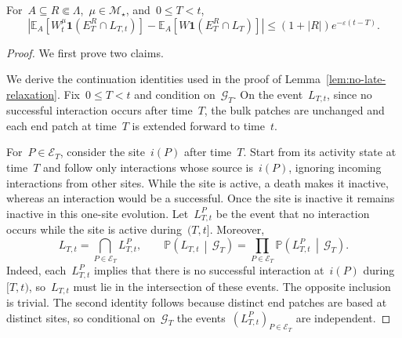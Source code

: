 \documentclass[EJP,preprint,NODS,nobera]{ejpecp}
\newcommand{\pP}{\mathbb{P}}
\newcommand{\E}{\mathbb{E}}
\newcommand{\CP}[2]{\pP\bb{#1\,\middle|\,#2}}
\newcommand{\bb}[1]{\left(#1\right)}
\newcommand{\Cb}[1]{\left[#1\right]}
\newcommand{\abs}[1]{\left|#1\right|}
\newcommand{\ind}{\mathbf{1}}
\begin{document}
\begin{lemma}
\label{lem:no-late-relaxation}
For~$A\subseteq R\Subset\Lambda$,~$\mu\in\mathcal M_\star$, and~$0\leq T<t$,
\begin{equation}
\label{eq:no-late-relaxation-bound}
\abs{
 \E_A\Cb{W_t^\mu\ind\bb{E_T^R\cap L_{T,t}}}
 -
 \E_A\Cb{W\ind\bb{E_T^R\cap L_T}}
}
\leq
\bb{1+\abs R}e^{-\varepsilon\bb{t-T}}.
\end{equation}
\end{lemma}

\begin{proof}
We first prove two claims.

We derive the continuation identities used in the proof of
Lemma~\ref{lem:no-late-relaxation}. Fix~$0\leq T<t$ and condition on~$\mathcal G_T$. On the event~$L_{T,t}$, since no successful interaction occurs after time~$T$, the bulk
patches are unchanged and each end patch at time~$T$ is extended forward to time~$t$.

For~$P\in\mathcal E_T$, consider the site~$i(P)$ after time~$T$.
Start from its activity state at time~$T$ and follow only interactions whose
source is~$i(P)$, ignoring incoming interactions from other sites. While the
site is active, a death makes it inactive, whereas an
interaction would be a successful. Once the site is inactive it
remains inactive in this one-site evolution. Let~$L_{T,t}^P$ be the event that
no interaction occurs while the site is active during~$(T,t]$. 
Moreover,
\begin{equation}
\label{eq:local-no-late-factorization}
L_{T,t}
=
\bigcap_{P\in\mathcal E_T}L_{T,t}^P,
\qquad
\CP{L_{T,t}}{\mathcal G_T}
=
\prod_{P\in\mathcal E_T}
\CP{L_{T,t}^P}{\mathcal G_T}.
\end{equation}
Indeed, each~$L_{T,t}^P$ implies that there is no successful interaction at~$i(P)$ during~$[T,t)$, so~$L_{T,t}$ must lie in the intersection of these events. The opposite inclusion is trivial. The second identity follows because distinct end patches are based at distinct sites, so conditional on~$\mathcal G_T$ the events~$(L_{T,t}^P)_{P\in\mathcal E_T}$ are independent.


\end{proof}
\end{document}
